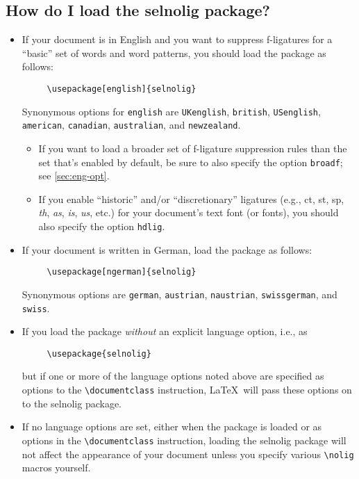 \documentclass[12pt]{article}
\newcommand{\pkg}[1]{\textsf{#1}}
\newcommand{\opt}[1]{\texttt{#1}}
\newcommand{\cmmd}[1]{\texttt{\textbackslash #1}}
\begin{document}
\subsection[How do I load the selnolig package?]{How do I load the \pkg{selnolig} package?}

\begin{itemize}
\item If your document is in English and you want to suppress f-ligatures for a \enquote{basic} set of words and word patterns, you should load the package as follows:
\begin{Verbatim}
     \usepackage[english]{selnolig}
\end{Verbatim}
Synonymous options for \opt{english} are \opt{UKenglish}, \opt{british}, \opt{USenglish}, \opt{american}, \opt{cana\-dian}, \opt{australian}, and \opt{new\-zealand}.

\begin{itemize}
\item If you want to load a broader set of f-ligature suppression rules than the set that's enabled by default, be sure to also specify the option \opt{broadf}; see  \cref{sec:eng-opt}.

\item If you enable \enquote{historic} and/or \enquote{discretionary} ligatures (e.g., ct, st, sp, \emph{th}, \emph{as}, \emph{is}, \emph{us}, etc.) for your document's text font (or fonts), you should also specify the option \opt{hdlig}.
\end{itemize}

\item If your document is written in German, load the package as follows:
\begin{Verbatim}
     \usepackage[ngerman]{selnolig}
\end{Verbatim}
Synonymous options are \opt{german}, \opt{austrian}, \opt{naustrian},  \opt{swissgerman}, and \opt{swiss}.

\item If you load the package \emph{without} an explicit language option, i.e., as
\begin{Verbatim}
     \usepackage{selnolig}
\end{Verbatim}
but if one or more of the language options noted above are specified as options to the \cmmd{documentclass} instruction, \LaTeX\ will pass these options on to the \pkg{selnolig} package.

\item If no language options are set, either when the package is loaded or as options in the \cmmd{documentclass} instruction, loading the \pkg{selnolig} package will not affect the appearance of your document unless you specify various \cmmd{nolig} macros yourself.
\end{itemize}
\end{document}
